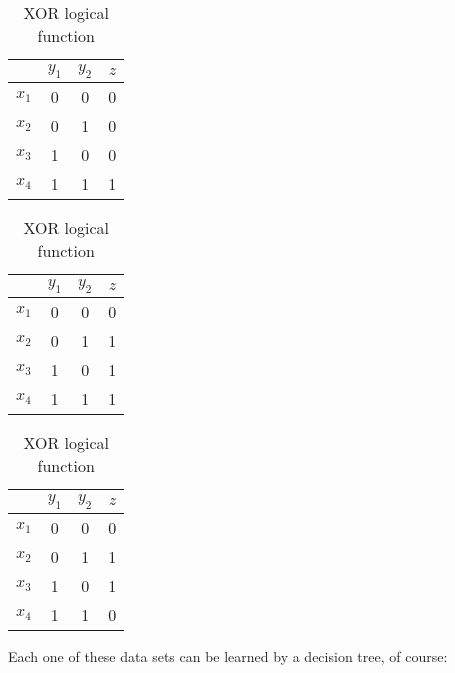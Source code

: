 \documentclass[12pt]{article}
\begin{document}
\begin{enumerate}[leftmargin=\labelsep]
        \begin{table}[!htb]
          \begin{minipage}{.333\linewidth}
            \centering
            \begin{tabular}{c|c|c|c}
                    & $y_1$ & $y_2$ & $z$ \\ \hline
              $x_1$ & 0     & 0     & 0   \\
              $x_2$ & 0     & 1     & 0   \\
              $x_3$ & 1     & 0     & 0   \\
              $x_4$ & 1     & 1     & 1
            \end{tabular}
            \caption{AND logical function}
          \end{minipage}\hfill
          \begin{minipage}{.333\linewidth}
            \centering
            \begin{tabular}{c|c|c|c}
                    & $y_1$ & $y_2$ & $z$ \\ \hline
              $x_1$ & 0     & 0     & 0   \\
              $x_2$ & 0     & 1     & 1   \\
              $x_3$ & 1     & 0     & 1   \\
              $x_4$ & 1     & 1     & 1
            \end{tabular}
            \caption{OR logical function}
          \end{minipage}\hfill
          \begin{minipage}{.333\linewidth}
            \centering
            \begin{tabular}{c|c|c|c}
                    & $y_1$ & $y_2$ & $z$ \\ \hline
              $x_1$ & 0     & 0     & 0   \\
              $x_2$ & 0     & 1     & 1   \\
              $x_3$ & 1     & 0     & 1   \\
              $x_4$ & 1     & 1     & 0
            \end{tabular}
            \caption{XOR logical function}
          \end{minipage}
        \end{table}

        Each one of these data sets can be learned by a decision tree, of course:

        \begin{figure}[H]
          \centering
          
        \end{figure}


\end{enumerate}
\end{document}

